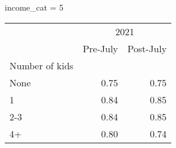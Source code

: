 income_cat = 5
\begin{tabular}{lll}
\cline{1-3}
\multicolumn{1}{c}{} &
  \multicolumn{2}{|c}{2021} \\
\multicolumn{1}{c}{} &
  \multicolumn{1}{|r}{Pre-July} &
  \multicolumn{1}{r}{Post-July} \\
\cline{1-3}
\multicolumn{1}{l}{Number of kids} &
  \multicolumn{1}{|r}{} &
  \multicolumn{1}{r}{} \\
\multicolumn{1}{l}{\hspace{1em}None} &
  \multicolumn{1}{|r}{0.75} &
  \multicolumn{1}{r}{0.75} \\
\multicolumn{1}{l}{\hspace{1em}1} &
  \multicolumn{1}{|r}{0.84} &
  \multicolumn{1}{r}{0.85} \\
\multicolumn{1}{l}{\hspace{1em}2-3} &
  \multicolumn{1}{|r}{0.84} &
  \multicolumn{1}{r}{0.85} \\
\multicolumn{1}{l}{\hspace{1em}4+} &
  \multicolumn{1}{|r}{0.80} &
  \multicolumn{1}{r}{0.74} \\
\cline{1-3}
\end{tabular}
